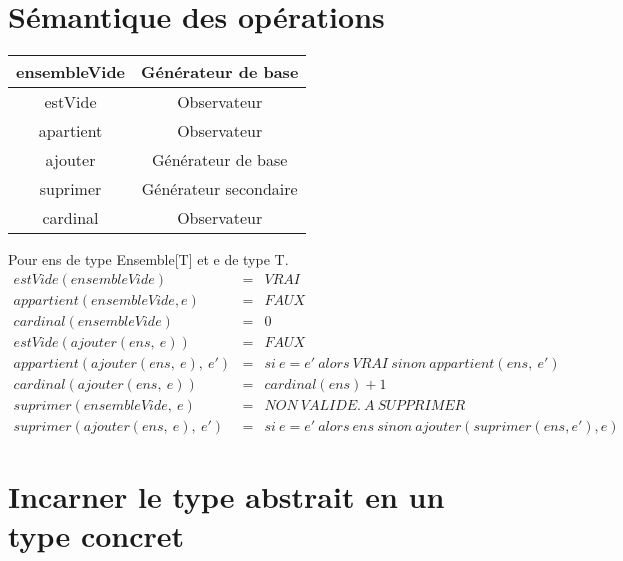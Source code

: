 \documentclass{slides}
\begin{document}
	\section{Sémantique des opérations}
	\begin{tabular}{|c|c|}
		\hline
			ensembleVide & Générateur de base\\
		\hline 
			estVide & Observateur \\
		\hline
			apartient & Observateur \\
		\hline
			ajouter & Générateur de base\\
		\hline
			suprimer & Générateur secondaire\\
		\hline
			cardinal & Observateur \\
		\hline	
	\end{tabular}
	\newpage
	Pour ens de type Ensemble[T] et e de type T.
	\begin{eqnarray}
		estVide(ensembleVide) &=& VRAI \\
		appartient(ensembleVide, e) &=& FAUX\\
		cardinal(ensembleVide) &=& 0\\
		estVide(ajouter(ens,~e)) &=& FAUX\\
		appartient(ajouter(ens,~e),~e') &=& si~e=e'~alors~VRAI~sinon~appartient
				(ens,~e')\\
		cardinal(ajouter(ens,~e)) &=& cardinal(ens)+1\\
		suprimer(ensembleVide,~e) &=& NON~VALIDE.~A~SUPPRIMER\\
		suprimer(ajouter(ens,~e),~e') &=& si~e=e'~alors~ens~sinon~ajouter
				(suprimer(ens,e'),e) 
	\end{eqnarray}	
	
	\section{Incarner le type abstrait en un type concret}
		
		
\end{document}
